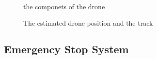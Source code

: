 \documentclass[lettersize,journal]{IEEEtran}
\begin{document}
\begin{figure}[H]
  \begin{center}
  \end{center}
  \caption{the componets of the drone}
  \label{fig:drone}
\end{figure}

\begin{figure}[H]
  \begin{center}
  \end{center}
  \caption{The estimated drone position and the track}
  \label{fig:drone_posi}
\end{figure}

\subsection{Emergency Stop System}
\end{document}
